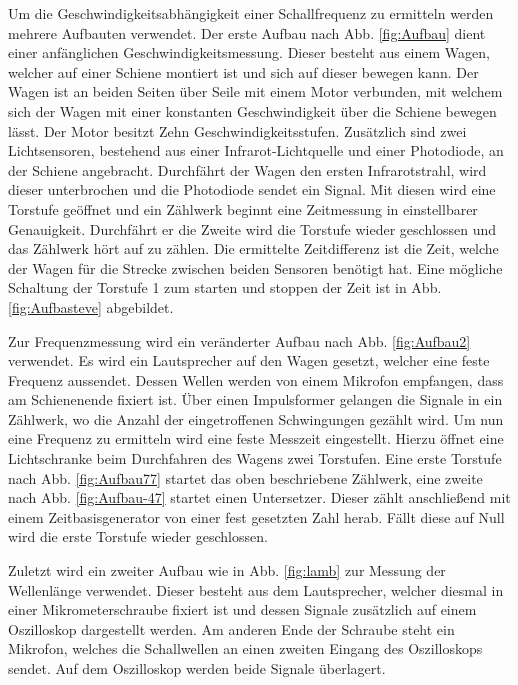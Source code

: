 Um die Geschwindigkeitsabhängigkeit einer Schallfrequenz zu ermitteln werden mehrere Aufbauten verwendet.
  Der erste Aufbau nach Abb. \ref{fig:Aufbau} dient einer anfänglichen Geschwindigkeitsmessung. Dieser besteht aus einem Wagen, welcher
   auf einer Schiene montiert ist und sich auf dieser bewegen kann.
 Der Wagen ist an beiden Seiten über Seile  mit einem Motor verbunden, mit welchem sich
  der Wagen mit einer konstanten Geschwindigkeit über die Schiene bewegen lässt.
   Der Motor besitzt Zehn Geschwindigkeitsstufen.
Zusätzlich sind zwei Lichtsensoren, bestehend aus einer Infrarot-Lichtquelle und
 einer Photodiode, an der Schiene angebracht.
    Durchfährt der Wagen
 den ersten Infrarotstrahl, wird dieser unterbrochen und die Photodiode sendet ein Signal.
 Mit diesen wird eine Torstufe geöffnet und ein Zählwerk beginnt eine Zeitmessung in einstellbarer Genauigkeit. Durchfährt er die Zweite wird die Torstufe wieder
  geschlossen und das Zählwerk hört auf zu zählen. Die ermittelte Zeitdifferenz ist die Zeit, welche der Wagen für die Strecke zwischen beiden Sensoren benötigt hat.
    Eine mögliche Schaltung der Torstufe 1 zum starten und stoppen der Zeit ist in Abb. \ref{fig:Aufbasteve} abgebildet.


  Zur Frequenzmessung wird ein veränderter Aufbau nach Abb. \ref{fig:Aufbau2} verwendet. Es wird ein Lautsprecher auf den Wagen gesetzt,
   welcher eine feste Frequenz aussendet. Dessen Wellen werden von einem Mikrofon empfangen, dass am
  Schienenende fixiert ist. Über einen Impulsformer gelangen die Signale in ein Zählwerk, wo die Anzahl der eingetroffenen Schwingungen gezählt wird.
   Um nun eine Frequenz zu ermitteln wird eine feste Messzeit eingestellt. Hierzu öffnet
   eine Lichtschranke beim Durchfahren des Wagens zwei Torstufen. Eine erste Torstufe nach Abb. \ref{fig:Aufbau77}
    startet das oben beschriebene Zählwerk, eine zweite nach Abb. \ref{fig:Aufbau-47} startet einen Untersetzer.
     Dieser zählt anschließend mit einem Zeitbasisgenerator von einer fest gesetzten Zahl herab.
      Fällt diese auf Null wird die erste Torstufe wieder geschlossen.


       Zuletzt wird ein zweiter Aufbau wie in Abb. \ref{fig:lamb} zur Messung der Wellenlänge verwendet.
       Dieser besteht aus dem Lautsprecher, welcher diesmal in einer Mikrometerschraube fixiert
        ist und dessen Signale zusätzlich auf einem Oszilloskop dargestellt werden.
        Am anderen Ende der Schraube steht ein Mikrofon, welches die Schallwellen an einen zweiten Eingang
         des Oszilloskops sendet. Auf dem Oszilloskop werden beide Signale überlagert.
